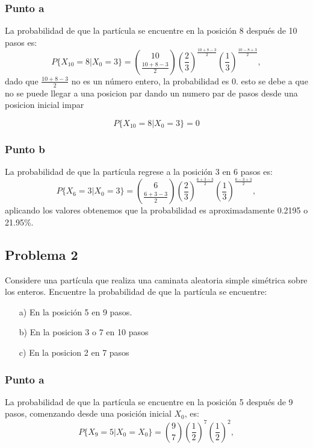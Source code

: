 \documentclass{article}
\begin{document}
\subsubsection*{Punto a}

La probabilidad de que la partícula se encuentre en la posición 8 después de 10 pasos es:
\[
    P\{X_{10} = 8 | X_0 = 3\} = \binom{10}{\frac{10 + 8 - 3}{2}} \left(\frac{2}{3}\right)^{\frac{10 + 8 - 3}{2}} \left(\frac{1}{3}\right)^{\frac{10 - 8 + 3}{2}},
\]
dado que \( \frac{10 + 8 - 3}{2} \) no es un número entero, la probabilidad es 0. esto se debe a que no se puede llegar a una posicion par dando un numero par de pasos desde una posicion inicial impar

\[
    P\{X_{10} = 8 | X_0 = 3\} = 0
\]

\subsubsection*{Punto b}

La probabilidad de que la partícula regrese a la posición 3 en 6 pasos es:
\[
    P\{X_6 = 3 | X_0 = 3\} = \binom{6}{\frac{6 + 3 - 3}{2}} \left(\frac{2}{3}\right)^{\frac{6 + 3 - 3}{2}} \left(\frac{1}{3}\right)^{\frac{6 - 3 + 3}{2}},
\]
aplicando los valores obtenemos que la probabilidad es aproximadamente 0.2195 o 21.95\%.

\subsection*{Problema 2}

Considere una partícula que realiza una caminata aleatoria simple simétrica sobre los enteros. Encuentre la probabilidad de que la partícula se encuentre:

\begin{enumerate}
    \item[a)] En la posición 5 en 9 pasos.
    \item[b)] En la posicion 3 o 7 en 10 pasos
    \item[c)] En la posicion 2 en 7 pasos
\end{enumerate}

\subsubsection*{Punto a}


La probabilidad de que la partícula se encuentre en la posición 5 después de 9 pasos, comenzando desde una posición inicial \(X_0\), es:
\[
    P\{X_9 = 5 | X_0 = X_0\} = \binom{9}{7} \left(\frac{1}{2}\right)^{7} \left(\frac{1}{2}\right)^{2},
\]
\end{document}
